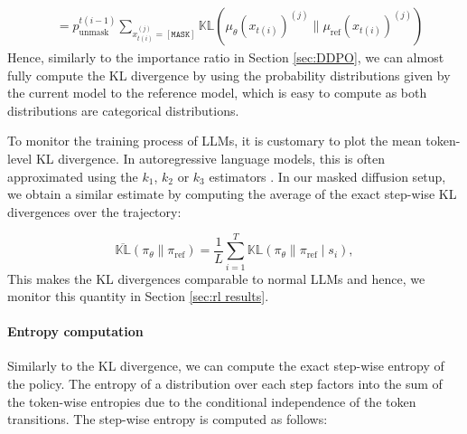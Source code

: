 {\begin{align}
         & = p_{\text{unmask}}^{t(i - 1)} \sum_{x_{t(i)}^{(j)} = [\mathtt{MASK}]} \mathbb{KL}\left(\mu_\theta(x_{t(i)})^{(j)} \parallel \mu_\text{ref}(x_{t(i)})^{(j)}\right)
        \label{eq:kl estimate}
    \end{align}
}Hence, similarly to the importance ratio in Section \ref{sec:DDPO}, we can almost fully compute the KL divergence by using the probability distributions given by the current model to the reference model, which is easy to compute as both distributions are categorical distributions.

To monitor the training process of LLMs, it is customary to plot the mean token-level KL divergence. In autoregressive language models, this is often approximated using the $k_1$, $k_2$ or $k_3$ estimators \cite{schulman2020klblog}. In our masked diffusion setup, we obtain a similar estimate by computing the average of the exact step-wise KL divergences over the trajectory:

\begin{equation}
    \overline{\mathbb{KL}}(\pi_\theta\parallel\pi_\text{ref}) = \frac{1}{L} \sum_{i=1}^{T} \mathbb{KL}(\pi_\theta\parallel\pi_\text{ref} \mid s_i),
    \label{eq:mean kl divergence}
\end{equation}
This makes the KL divergences comparable to normal LLMs and hence, we monitor this quantity in Section \ref{sec:rl results}.



\paragraph{Entropy computation}

Similarly to the KL divergence, we can compute the exact step-wise entropy of the policy. The entropy of a distribution over each step factors into the sum of the token-wise entropies due to the conditional independence of the token transitions. The step-wise entropy is computed as follows:

